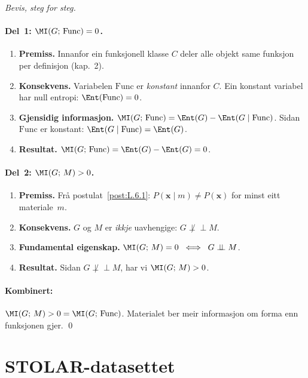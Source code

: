 \begin{proof}[Bevis, steg for steg]
\paragraph{Del~1: $\MI(G;\, \mathrm{Func}) = 0$.}%
\begin{enumerate}
  \item \textbf{Premiss.}\;
    Innanfor ein funksjonell klasse $C$ deler alle objekt same
    funksjon per definisjon (kap.~2).
  \item \textbf{Konsekvens.}\;
    Variabelen $\mathrm{Func}$ er \emph{konstant} innanfor $C$.
    Ein konstant variabel har null entropi:
    $\Ent(\mathrm{Func}) = 0$.
  \item \textbf{Gjensidig informasjon.}\;
    $\MI(G;\, \mathrm{Func}) = \Ent(G) -
    \Ent(G \mid \mathrm{Func})$.
    Sidan $\mathrm{Func}$ er konstant:
    $\Ent(G \mid \mathrm{Func}) = \Ent(G)$.
  \item \textbf{Resultat.}\;
    $\MI(G;\, \mathrm{Func}) = \Ent(G) - \Ent(G) = 0$.
\end{enumerate}

\paragraph{Del~2: $\MI(G;\, M) > 0$.}%
\begin{enumerate}
  \item \textbf{Premiss.}\;
    Frå postulat~\ref{post:L.6.1}:
    $P(\bm{x} \mid m) \neq P(\bm{x})$ for minst eitt
    materiale~$m$.
  \item \textbf{Konsekvens.}\;
    $G$ og $M$ er \emph{ikkje} uavhengige:
    $G \not\perp\!\!\!\perp M$.
  \item \textbf{Fundamental eigenskap.}\;
    $\MI(G;\, M) = 0 \;\iff\; G \perp\!\!\!\perp M$.
  \item \textbf{Resultat.}\;
    Sidan $G \not\perp\!\!\!\perp M$, har vi $\MI(G;\, M) > 0$.
\end{enumerate}

\paragraph{Kombinert:}
$\MI(G;\, M) > 0 = \MI(G;\, \mathrm{Func})$. Materialet ber meir
informasjon om forma enn funksjonen gjer. \qed
\end{proof}


\section{STOLAR-datasettet}

